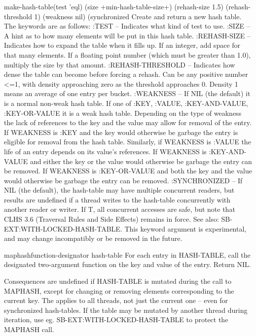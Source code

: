 \begin{function}{make-hash-table}{\key (test 'eql) (size +min-hash-table-size+) (rehash-size 1.5)
 (rehash-threshold 1) (weakness nil) (synchronized}{}
  Create and return a new hash table. The keywords are as follows:
     :TEST -- Indicates what kind of test to use.
     :SIZE -- A hint as to how many elements will be put in this hash
       table.
     :REHASH-SIZE -- Indicates how to expand the table when it fills up.
       If an integer, add space for that many elements. If a floating
       point number (which must be greater than 1.0), multiply the size
       by that amount.
     :REHASH-THRESHOLD -- Indicates how dense the table can become before
       forcing a rehash. Can be any positive number <=1, with density
       approaching zero as the threshold approaches 0. Density 1 means an
       average of one entry per bucket.
     :WEAKNESS -- If NIL (the default) it is a normal non-weak hash table.
       If one of :KEY, :VALUE, :KEY-AND-VALUE, :KEY-OR-VALUE it is a weak
       hash table.
       Depending on the type of weakness the lack of references to the
       key and the value may allow for removal of the entry. If WEAKNESS
       is :KEY and the key would otherwise be garbage the entry is eligible
       for removal from the hash table. Similarly, if WEAKNESS is :VALUE
       the life of an entry depends on its value's references. If WEAKNESS
       is :KEY-AND-VALUE and either the key or the value would otherwise be
       garbage the entry can be removed. If WEAKNESS is :KEY-OR-VALUE and
       both the key and the value would otherwise be garbage the entry can
       be removed.
     :SYNCHRONIZED -- If NIL (the default), the hash-table may have
       multiple concurrent readers, but results are undefined if a
       thread writes to the hash-table concurrently with another
       reader or writer. If T, all concurrent accesses are safe, but
       note that CLHS 3.6 (Traversal Rules and Side Effects) remains
       in force. See also: SB-EXT:WITH-LOCKED-HASH-TABLE. This keyword
       argument is experimental, and may change incompatibly or be
       removed in the future.
\end{function}

\begin{function}{maphash}{function-designator hash-table}{}
  For each entry in HASH-TABLE, call the designated two-argument function on
the key and value of the entry. Return NIL.

Consequences are undefined if HASH-TABLE is mutated during the call to
MAPHASH, except for changing or removing elements corresponding to the
current key. The applies to all threads, not just the current one --
even for synchronized hash-tables. If the table may be mutated by
another thread during iteration, use eg. SB-EXT:WITH-LOCKED-HASH-TABLE
to protect the MAPHASH call.
\end{function}

